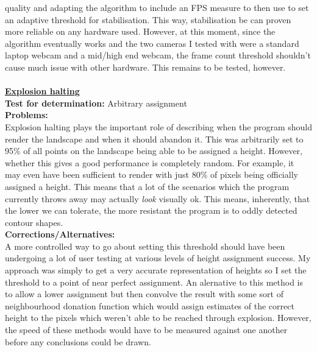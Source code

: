 \documentclass[11pt]{article}
\begin{document}
			quality and adapting the algorithm to include
			an FPS measure to then use to set an
			adaptive threshold for stabilisation. This way, stabilisation
			be can proven more reliable on any hardware used. However,
			at this moment, since the algorithm eventually works and the
			two cameras I tested with were a standard laptop webcam and a
			mid/high end webcam, the frame count threshold shouldn't cause
			much issue with other hardware. This remains to be tested, however.\\
\\
\underline{\textbf{Explosion halting}}\\
\textbf{Test for determination:} Arbitrary assignment\\
\textbf{Problems:}\\ Explosion halting plays the important role 
				of describing when the program should render
				the landscape and when it should abandon it. This
				was arbitrarily set to 95\% of all points on the
				landscape being able to be assigned a height. However,
				whether this gives a good performance is completely
				random. For example, it may even have
				been sufficient to render with just 80\% of pixels
				being officially assigned a height. This means that
				a lot of the scenarios which the program currently 
				throws away may actually \textit{look} visually ok.
				This means, inherently, that the lower we can tolerate,
				the more resistant the program is to oddly detected 
				contour shapes. \\
\textbf{Corrections/Alternatives:}\\ A more controlled way to go about 
				setting this threshold should have been undergoing
				a lot of user testing at various levels of height 
				assignment success. My approach was simply to get a very
				accurate representation of heights so I set the threshold
				to a point of near perfect assignment. An alernative to
				this method is to allow a lower assignment but then
				convolve the result with some sort of neighbourhood 
				donation function which would assign estimates of the correct
				height to the pixels which weren't able to be reached
				through explosion. However, the speed of these methods
				would have to be measured against one another before any
				conclusions could be drawn.
				
				
\end{document}
